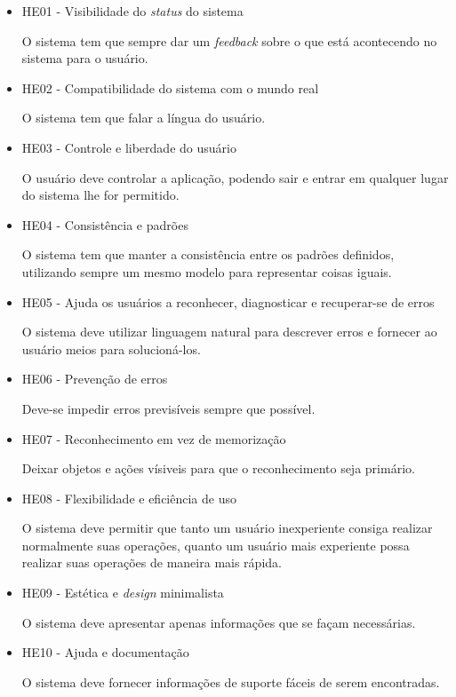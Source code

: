     \begin{itemize}
     \item HE01 - Visibilidade do \textit{status} do sistema
  
	\subitem O sistema tem que sempre dar um \textit{feedback} sobre o que está acontecendo no sistema para o usuário.
     
     \item HE02 - Compatibilidade do sistema com o mundo real
  
	\subitem O sistema tem que falar a língua do usuário.
	
     \item HE03 - Controle e liberdade do usuário
     
	\subitem O usuário deve controlar a aplicação, podendo sair e entrar em qualquer lugar do sistema lhe for permitido.
     
     \item HE04 - Consistência e padrões
      
	\subitem O sistema tem que manter a consistência entre os padrões definidos, utilizando sempre um mesmo modelo para representar
	coisas iguais.
	
     \item HE05 - Ajuda os usuários a reconhecer, diagnosticar e recuperar-se de erros
	
	\subitem O sistema deve utilizar linguagem natural para descrever erros e fornecer ao usuário meios para solucioná-los.
	
     \item HE06 - Prevenção de erros
	
	\subitem Deve-se impedir erros previsíveis sempre que possível.
	
     \item HE07 - Reconhecimento em vez de memorização
	
	\subitem Deixar objetos e ações vísiveis para que o reconhecimento seja primário.
	
     \item HE08 - Flexibilidade e eficiência de uso
	
	\subitem O sistema deve permitir que tanto um usuário inexperiente consiga realizar normalmente suas operações,
	quanto um usuário mais experiente possa realizar suas operações de maneira mais rápida.
	
     \item HE09 - Estética e \textit{design} minimalista
	
	\subitem O sistema deve apresentar apenas informações que se façam necessárias.
	
     \item HE10 - Ajuda e documentação
     
	\subitem O sistema deve fornecer informações de suporte fáceis de serem encontradas.
      
    \end{itemize}
      
